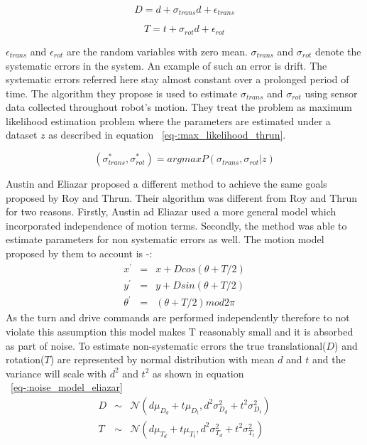\documentclass[12pt]{dalcsthesis}
\begin{document}
\begin{equation}
\label{eq-: thrun_noise_D}
D= d+ \sigma_{trans}d+\epsilon_{trans}
\end{equation}

\begin{equation}
\label{eq-: thrun_noise_T}
  T= t+ \sigma_{rot}d+\epsilon_{rot}
\end{equation}

$\epsilon_{trans}$ and $\epsilon_{rot}$ are the random variables with zero mean. $\sigma_{trans}$ and $\sigma_{rot}$ denote the systematic errors in the system. An example of such an error is drift. The systematic errors referred here stay almost constant over a prolonged period of time. The algorithm they propose is used to estimate $\sigma_{trans}$ and $\sigma_{rot}$ using sensor data collected throughout robot's motion. They treat the problem as maximum likelihood estimation problem where the parameters are estimated under a dataset $z$ as described in equation ~\ref{eq-:max_likelihood_thrun}.

\begin{equation}
\label{eq-:max_likelihood_thrun}
 (\sigma_{trans}^{*},\sigma_{rot}^{*}) = argmax P(\sigma_{trans},\sigma_{rot}|z)
\end{equation}

Austin and Eliazar \cite{Eliazar2004} proposed a different method to achieve the same goals proposed by Roy and Thrun. Their algorithm was different from Roy and Thrun for two reasons. Firstly, Austin ad Eliazar used a more general model which incorporated independence of motion terms. Secondly, the method was able to estimate parameters for non systematic errors as well. 
The motion model proposed by them to account is -:
\begin{equation}
	\begin{aligned}
	x^{'}&=&x+Dcos(\theta+T/2) \\
	y^{'}&=&y+Dsin(\theta+T/2) \\
	\theta^{'}&=&(\theta+T/2)mod2\pi
	\end{aligned}
\end{equation}
As the turn and drive commands are performed independently therefore to not violate this assumption this model makes T reasonably small and it is absorbed as part of noise. To estimate non-systematic errors the true translational($D$) and rotation($T$) are represented by normal distribution with mean $d$ and $t$ and the variance will scale with $d^2$ and $t^2$ as shown in equation ~\ref{eq-:noise_model_eliazar}
\begin{equation}
\label{eq-:noise_model_eliazar}
\begin{aligned}
D &\sim& \mathcal{{N}}(d\mu_{D_{d}}+t\mu_{D_{t}},d^2\sigma_{D_{d}}^2+t^2\sigma_{D_{t}}^2)\\
T &\sim& \mathcal{{N}}(d\mu_{T_{d}}+t\mu_{T_{t}},d^2\sigma_{T_{d}}^2+t^2\sigma_{T_{t}}^2)
\end{aligned}
\end{equation}
\end{document}
